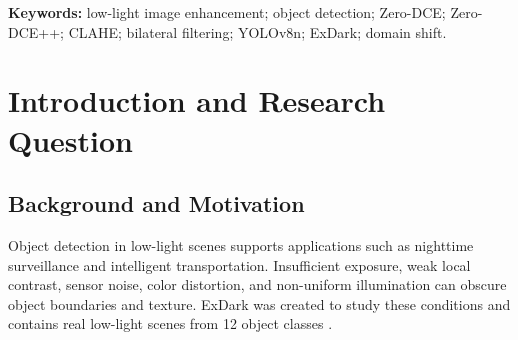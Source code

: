 \documentclass[11pt,a4paper]{article}
\begin{document}
\begin{center}
\begin{minipage}{0.86\textwidth}
\begin{abstract}
Project 18 asks whether low-light image enhancement improves downstream
recognition rather than only perceptual quality. We evaluate a two-stage
enhancement--detection pipeline on a processed ExDark dataset containing 7,345
images and 12 object classes. The comparison uses a raw baseline and five
enhancement cases: CLAHE, CLAHE with bilateral filtering, Zero-DCE trained from
scratch, pretrained Zero-DCE++, and Zero-DCE++ with bilateral filtering. All
trained YOLOv8n detectors use a 40-epoch budget and the same data split and
hyperparameters. The scratch Zero-DCE main result is a direct cascade that keeps
the raw-domain detector fixed; it obtains 22.91\% mAP@0.5 and 9.70\%
mAP@0.5:0.95. The separately consolidated raw baseline obtains 61.46\% and
28.62\%, while Zero-DCE++--bilateral reaches 62.44\% and 29.21\%. Because the
scratch row uses a fixed detector whereas the other enhanced rows use matched
fine-tuning, its degradation measures domain transfer and is not a pure
enhancer-only comparison. The evidence supports a method-dependent conclusion:
visual enhancement alone does not guarantee better recognition, and controlled
comparison requires identical detector settings and traceable artifacts.
\end{abstract}

\noindent
\textbf{Keywords:}
low-light image enhancement;
object detection;
Zero-DCE;
Zero-DCE++;
CLAHE;
bilateral filtering;
YOLOv8n;
ExDark;
domain shift.
\end{minipage}
\end{center}



\section{Introduction and Research Question}

\subsection{Background and Motivation}

Object detection in low-light scenes supports applications such as nighttime
surveillance and intelligent transportation. Insufficient exposure, weak local
contrast, sensor noise, color distortion, and non-uniform illumination can
obscure object boundaries and texture. ExDark was created to study these
conditions and contains real low-light scenes from 12 object classes
\cite{loh2019exdark}.
\end{document}
